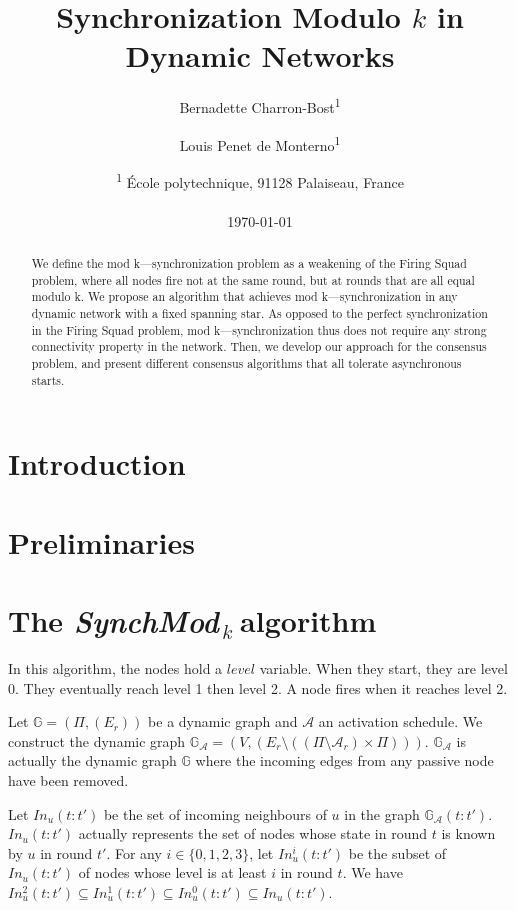 \documentclass[11pt,letterpaper]{article}
\title{Synchronization Modulo $k$ in Dynamic Networks}
\author{Bernadette Charron-Bost\textsuperscript{1} \and Louis Penet de Monterno\textsuperscript{1}}
\date{\textsuperscript{1} \'Ecole polytechnique, 91128 Palaiseau, France\\~\\ \today}
\newcommand{\SM}{{\em SynchMod}$_{\,k}\ $}
\begin{document}
\maketitle
\tableofcontents

\begin{abstract}
	We define the mod k—synchronization problem as a weakening of the Firing Squad problem,
	where all nodes fire not at the same round, but at rounds that are all equal modulo k.
	We propose an algorithm that achieves mod k—synchronization  in any dynamic network
	with a fixed spanning star. As opposed to the perfect synchronization in
	the Firing Squad problem, mod k—synchronization thus does not require
	any strong connectivity property in the network. 
	Then, we develop our approach for the consensus problem,
	and present different consensus algorithms that all tolerate asynchronous starts.
\end{abstract}

\section{Introduction}

\section{Preliminaries}\label{sec:model}

\section{The \SM algorithm}

In this algorithm, the nodes hold a $level$ variable. When they start, they are level 0. They eventually reach level 1 then level 2.
A node fires when it reaches level 2.

Let $\mathds{G} = (\Pi, (E_r))$ be a dynamic graph and $\mathcal{A}$ an activation schedule.
We construct the dynamic graph $\mathds{G}_\mathcal{A} = (V, (E_r \setminus ((\Pi \setminus \mathcal{A}_r) \times \Pi)))$.
$\mathds{G}_\mathcal{A}$ is actually the dynamic graph $\mathds{G}$ where the incoming edges from any passive node have been removed.

Let $In_u(t:t')$ be the set of incoming neighbours of $u$ in the graph $\mathds{G}_\mathcal{A}(t:t')$.
$In_u(t:t')$ actually represents the set of nodes whose state in round $t$ is known by $u$ in round $t'$.
For any $i \in \{0, 1, 2, 3\}$, let $In_u^i(t:t')$ be the subset of $In_u(t:t')$ of nodes whose level is at least $i$ in round $t$.
We have $In_u^2(t:t') \subseteq In_u^1(t:t') \subseteq In_u^0(t:t') \subseteq In_u(t:t')$.
\end{document}
